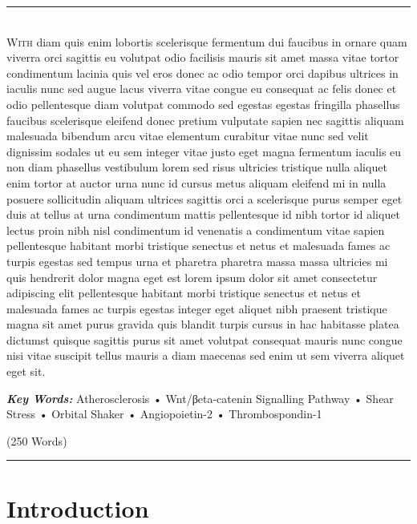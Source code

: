 \documentclass[
  12pt,
]{article}
\begin{document}
\newpage
\linenumbers
{}
\rule{\textwidth}{0.4pt}\\
\lettrine[lines=2,slope=0pt,nindent=0pt, loversize=0.2]{W}{ith} diam quis enim lobortis scelerisque fermentum dui faucibus in ornare quam viverra orci sagittis eu volutpat odio facilisis mauris sit amet massa vitae tortor condimentum lacinia quis vel eros donec ac odio tempor orci dapibus ultrices in iaculis nunc sed augue lacus viverra vitae congue eu consequat ac felis donec et odio pellentesque diam volutpat commodo sed egestas egestas fringilla phasellus faucibus scelerisque eleifend donec pretium vulputate sapien nec sagittis aliquam malesuada bibendum arcu vitae elementum curabitur vitae nunc sed velit dignissim sodales ut eu sem integer vitae justo eget magna fermentum iaculis eu non diam phasellus vestibulum lorem sed risus ultricies tristique nulla aliquet enim tortor at auctor urna nunc id cursus metus aliquam eleifend mi in nulla posuere sollicitudin aliquam ultrices sagittis orci a scelerisque purus semper eget duis at tellus at urna condimentum mattis pellentesque id nibh tortor id aliquet lectus proin nibh nisl condimentum id venenatis a condimentum vitae sapien pellentesque habitant morbi tristique senectus et netus et malesuada fames ac turpis egestas sed tempus urna et pharetra pharetra massa massa ultricies mi quis hendrerit dolor magna eget est lorem ipsum dolor sit amet consectetur adipiscing elit pellentesque habitant morbi tristique senectus et netus et malesuada fames ac turpis egestas integer eget aliquet nibh praesent tristique magna sit amet purus gravida quis blandit turpis cursus in hac habitasse platea dictumst quisque sagittis purus sit amet volutpat consequat mauris nunc congue nisi vitae suscipit tellus mauris a diam maecenas sed enim ut sem viverra aliquet eget sit.\\

\begin{center}
\textbf{\textit{Key Words:}} Atherosclerosis • Wnt/βeta-catenin Signalling Pathway • Shear Stress • Orbital Shaker • Angiopoietin-2 • Thrombospondin-1\\
\end{center}

\begin{flushright}
(250 Words)\\
\end{flushright}
\rule{\textwidth}{0.4pt}

\hypertarget{introduction}{%
\section{Introduction}\label{introduction}}
\end{document}
